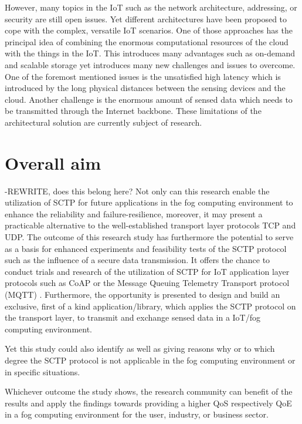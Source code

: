However, many topics in the IoT such as the network architecture, addressing, or security are still open issues\cite{Borgia2014}. Yet different architectures have been proposed to cope with the complex, versatile IoT scenarios. One of those approaches has the principal idea of combining the enormous computational resources of the cloud with the things in the IoT. This introduces many advantages such as on-demand and scalable storage yet introduces many new challenges and issues to overcome. One of the foremost mentioned issues is the unsatisfied high latency \cite{Yi2015} which is introduced by the long physical distances between the sensing devices and the cloud. Another challenge is the enormous amount of sensed data which needs to be transmitted through the Internet backbone. These limitations of the architectural solution are currently subject of research.





\section{Overall aim}
\label{sec:overallaim}

-REWRITE, does this belong here?
Not only can this research enable the utilization of SCTP for future applications in the fog computing environment to enhance the reliability and failure-resilience, moreover, it may present a practicable alternative to the well-established transport layer protocols TCP and UDP. 
The outcome of this research study has furthermore the potential to serve as a basis for enhanced experiments and feasibility tests of the SCTP protocol such as the influence of a secure data transmission. It offers the chance to conduct trials and research of the utilization of SCTP for IoT application layer protocols such as CoAP or the Message Queuing Telemetry Transport protocol (MQTT) \cite{specMQTT}. Furthermore, the opportunity is presented to design and build an exclusive, first of a kind application/library, which applies the SCTP protocol on the transport layer, to transmit and exchange sensed data in a IoT/fog computing environment.

Yet this study could also identify as well as giving reasons why or to which degree the SCTP protocol is not applicable in the fog computing environment or in specific situations. 

Whichever outcome the study shows, the research community can benefit of the results and apply the findings towards providing a higher QoS respectively QoE in a fog computing environment for the user, industry, or business sector.



